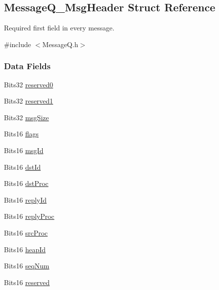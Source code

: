 \subsection{Message\-Q\-\_\-\-Msg\-Header Struct Reference}
\label{struct_message_q___msg_header}


Required first field in every message.  




{\ttfamily \#include $<$Message\-Q.\-h$>$}

\subsubsection*{Data Fields}
\begin{DoxyCompactItemize}
\item 
Bits32 \hyperlink{struct_message_q___msg_header_aa8269e435d09e486b167c0b6f9cc90b0}{reserved0}
\item 
Bits32 \hyperlink{struct_message_q___msg_header_a1e12c3020f3f175128bf2ae4c5d1df7c}{reserved1}
\item 
Bits32 \hyperlink{struct_message_q___msg_header_adee0e6ed997b218584e2009854fa5214}{msg\-Size}
\item 
Bits16 \hyperlink{struct_message_q___msg_header_a377485e7c13fde415d7d8811fe8f4f37}{flags}
\item 
Bits16 \hyperlink{struct_message_q___msg_header_abb97c08bbc06479c4a5e5fde91412e57}{msg\-Id}
\item 
Bits16 \hyperlink{struct_message_q___msg_header_af37bb45f1801bf39207a7293bf5a05d3}{dst\-Id}
\item 
Bits16 \hyperlink{struct_message_q___msg_header_a6a4fcb509b74acd7d45f23a55c71d552}{dst\-Proc}
\item 
Bits16 \hyperlink{struct_message_q___msg_header_ac933455354a8b5735404cbc81147dd06}{reply\-Id}
\item 
Bits16 \hyperlink{struct_message_q___msg_header_a9c6cbc63347f25ea6cc47338d570cb48}{reply\-Proc}
\item 
Bits16 \hyperlink{struct_message_q___msg_header_a29c80efb7f32089965ce1a0e69b7262c}{src\-Proc}
\item 
Bits16 \hyperlink{struct_message_q___msg_header_a4281bf0f37f64a9c5e580f0abc3536eb}{heap\-Id}
\item 
Bits16 \hyperlink{struct_message_q___msg_header_afcef65b2eebc0e508363870743706909}{seq\-Num}
\item 
Bits16 \hyperlink{struct_message_q___msg_header_a66d4a1e8d4a20da8bad4feca1c710e53}{reserved}
\end{DoxyCompactItemize}


